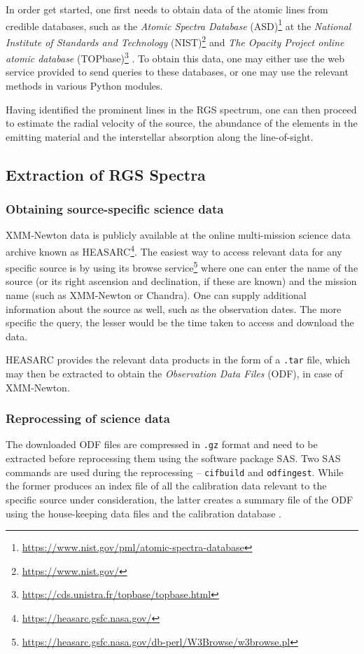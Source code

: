         In order get started, one first needs to obtain data of the atomic lines from credible databases, such as the \textit{Atomic Spectra Database} (ASD)\footnote{\url{https://www.nist.gov/pml/atomic-spectra-database}} at the \textit{National Institute of Standards and Technology} (NIST)\footnote{\url{https://www.nist.gov/}} \cite{ralchenko2008nist} and \textit{The Opacity Project online atomic database} (TOPbase)\footnote{\url{https://cds.unistra.fr/topbase/topbase.html}} \cite{cunto1993topbase}. To obtain this data, one may either use the web service provided to send queries to these databases, or one may use the relevant methods in various Python modules.
        
        Having identified the prominent lines in the RGS spectrum, one can then proceed to estimate the radial velocity of the source, the abundance of the elements in the emitting material and the interstellar absorption along the line-of-sight.
        
        \subsection{Extraction of RGS Spectra} \label{tool:rgs-files:extraction}
        
            \subsubsection{Obtaining source-specific science data} \label{tool:rgs-files:extraction:data}
                XMM-Newton data is publicly available at the online multi-mission science data archive known as HEASARC\footnote{\url{https://heasarc.gsfc.nasa.gov/}}. The easiest way to access relevant data for any specific source is by using its browse service\footnote{\url{https://heasarc.gsfc.nasa.gov/db-perl/W3Browse/w3browse.pl}} where one can enter the name of the source (or its right ascension and declination, if these are known) and the mission name (such as XMM-Newton or Chandra). One can supply additional information about the source as well, such as the observation dates. The more specific the query, the lesser would be the time taken to access and download the data.
                
                HEASARC provides the relevant data products in the form of a \texttt{.tar} file, which may then be extracted to obtain the \textit{Observation Data Files} (ODF), in case of XMM-Newton.
            
            \subsubsection{Reprocessing of science data} \label{tool:rgs-files:extraction:reprocess}
                The downloaded ODF files are compressed in \texttt{.gz} format and need to be extracted before reprocessing them using the software package SAS. Two SAS commands are used during the reprocessing – \texttt{cifbuild} and \texttt{odfingest}. While the former produces an index file of all the calibration data relevant to the specific source under consideration, the latter creates a summary file of the ODF using the house-keeping data files and the calibration database \cite{de2019users}.
                
